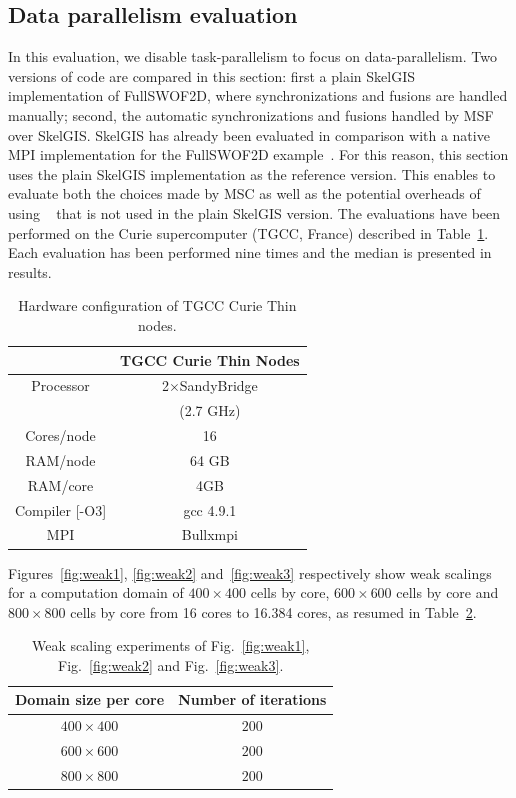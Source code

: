 \subsection{Data parallelism evaluation}

In this evaluation, we disable task-parallelism to focus on data-parallelism. Two versions of code are compared in this section: first a plain SkelGIS implementation of FullSWOF2D, where synchronizations and fusions are handled manually; second, the automatic synchronizations and fusions handled by MSF over SkelGIS. SkelGIS has already been evaluated in comparison with a native MPI implementation for the FullSWOF2D example~\cite{CPE:CPE3494}. For this reason, this section uses the plain SkelGIS implementation as the reference version. This enables to evaluate both the choices made by MSC as well as the potential overheads of using \llc~\cite{l2c} that is not used in the plain SkelGIS version. The evaluations have been performed on the Curie supercomputer (TGCC, France) described in Table~\ref{tab:TGCC}. Each evaluation has been performed nine times and the median is presented in results.

\begin{table}[!ht]
\begin{center}
 \begin{tabular}{|c|c|}
     & TGCC Curie Thin Nodes\\
     \hline         
    Processor & 2$\times$SandyBridge\\
    & (2.7 GHz)\\
    Cores/node & 16 \\
    RAM/node & 64 GB\\
    RAM/core & 4GB\\
    Compiler [-O3] & gcc 4.9.1\\
    MPI & Bullxmpi\\
 \end{tabular}
 \caption{\label{tab:TGCC}Hardware configuration of TGCC Curie Thin nodes.}
 \end{center}
\end{table}

Figures~\ref{fig:weak1}, \ref{fig:weak2} and~\ref{fig:weak3} respectively show weak scalings for a computation domain of $400 \times 400$ cells by core, $600 \times 600$ cells by core and $800 \times 800$ cells by core from 16 cores to 16.384 cores, as resumed in Table~\ref{tab:weak}.

\begin{table}[!ht]
\begin{center}
 \begin{tabular}{|c|c|}
    Domain size per core & Number of iterations\\
    \hline
     $400 \times 400$ & $200$\\
     $600 \times 600$ & $200$\\
     $800 \times 800$ & $200$\\
 \end{tabular}
 \caption{\label{tab:weak}Weak scaling experiments of Fig.~\ref{fig:weak1}, Fig.~\ref{fig:weak2} and Fig.~\ref{fig:weak3}.}
 \end{center}
\end{table}

